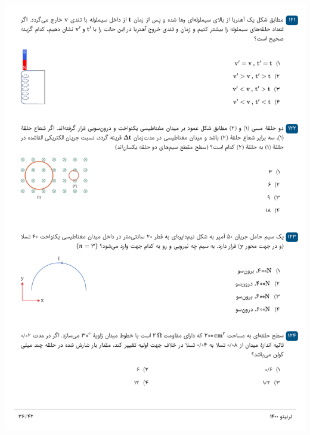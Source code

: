 \documentclass{book}
\begin{document}
\includegraphics[width=\textwidth]{"pages/36"}
\end{document}
